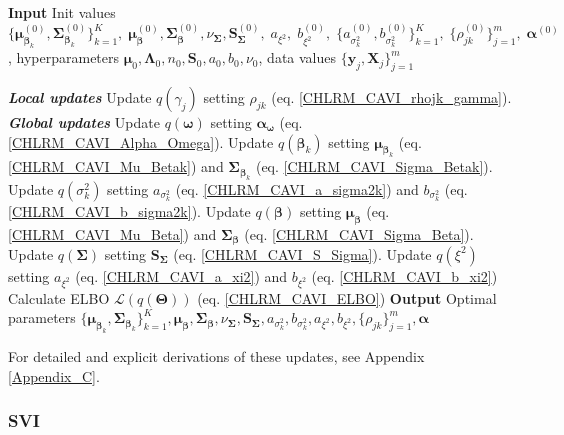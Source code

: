 \begin{algorithm}[H]
\caption{CAVI for CHLRM}
\label{CAVI_CHLRM_alg}
\begin{algorithmic}
\State \textbf{Input} Init values $\{\bm{\mu}_{\bm{\beta}_k}^{(0)}, \bm{\Sigma}_{\bm{\beta}_k}^{(0)}\}_{k=1}^K,\;\bm{\mu}_{\bm{\beta}}^{(0)},\bm{\Sigma}_{\bm{\beta}}^{(0)},\nu_{\bm{\Sigma}},\bm{S}_{\bm{\Sigma}}^{(0)},\;a_{\xi^2},\; b_{\xi^2}^{(0)},\;\{a_{\sigma_k^2}^{(0)}, b_{\sigma_k^2}^{(0)}\}_{k=1}^K,\;\{\rho_{jk}^{(0)}\}_{j=1}^m,\;\bm{\alpha}^{(0)}$, hyperparameters $\bm{\mu}_0,\bm{\Lambda}_0,n_0,\bm{S}_0,a_0,b_0,\nu_0$, data values $\{\bm{y}_j,\bm{X}_j\}_{j=1}^m$

  \State \textbf{\textit{Local updates}}
    \State Update $q(\gamma_j)$ setting $\rho_{jk}$ (eq. \ref{CHLRM_CAVI_rhojk_gamma}).
  \EndFor
  \State \textbf{\textit{Global updates}}
  \State Update $q(\bm{\omega})$ setting $\bm{\alpha}_{\bm\omega}$ (eq. \ref{CHLRM_CAVI_Alpha_Omega}).
    \State Update $q(\bm{\beta}_k)$ setting $\bm{\mu}_{\bm{\beta}_k}$ (eq. \ref{CHLRM_CAVI_Mu_Betak}) and $\bm{\Sigma}_{\bm{\beta}_k}$ (eq. \ref{CHLRM_CAVI_Sigma_Betak}).
    \State Update $q(\sigma_k^2)$ setting $a_{\sigma_k^2}$ (eq. \ref{CHLRM_CAVI_a_sigma2k}) and $b_{\sigma_k^2}$ (eq. \ref{CHLRM_CAVI_b_sigma2k}).
  \EndFor
  \State Update $q(\bm{\beta})$ setting $\bm{\mu}_{\bm{\beta}}$ (eq. \ref{CHLRM_CAVI_Mu_Beta}) and $\bm{\Sigma}_{\bm{\beta}}$ (eq. \ref{CHLRM_CAVI_Sigma_Beta}).
  \State Update $q(\bm{\Sigma})$ setting $\bm{S}_{\bm{\Sigma}}$ (eq. \ref{CHLRM_CAVI_S_Sigma}).
  \State Update $q(\xi^2)$ setting $a_{\xi^2}$ (eq. \ref{CHLRM_CAVI_a_xi2}) and $b_{\xi^2}$ (eq. \ref{CHLRM_CAVI_b_xi2})
\EndWhile
\State Calculate ELBO $\mathcal{L}\left(q(\bm{\Theta})\right)$  (eq. \ref{CHLRM_CAVI_ELBO})
\State \textbf{Output} Optimal parameters $
\{\bm{\mu}_{\bm{\beta}_k},\bm{\Sigma}_{\bm{\beta}_k}\}_{k=1}^K,
\bm{\mu}_{\bm{\beta}},\bm{\Sigma}_{\bm{\beta}},\nu_{\bm{\Sigma}},
\bm{S}_{\bm{\Sigma}},
a_{\sigma_k^2}, b_{\sigma_k^2},
a_{\xi^2}, b_{\xi^2},
\{\rho_{jk}\}_{j=1}^m,\bm{\alpha}$
\end{algorithmic}
\end{algorithm}

For detailed and explicit derivations of these updates, see Appendix \ref{Appendix_C}.

\subsubsection{SVI}

